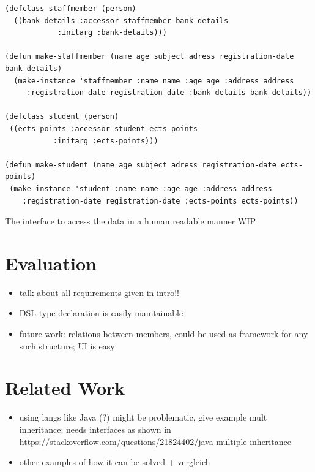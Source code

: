 \documentclass[oribibl]{llncs}
\begin{document}
\begin{listing}[]%
\begin{verbatim}
(defclass staffmember (person)
  ((bank-details :accessor staffmember-bank-details
            :initarg :bank-details)))

(defun make-staffmember (name age subject adress registration-date bank-details)
  (make-instance 'staffmember :name name :age age :address address
     :registration-date registration-date :bank-details bank-details))

(defclass student (person)
 ((ects-points :accessor student-ects-points
           :initarg :ects-points)))

(defun make-student (name age subject adress registration-date ects-points)
 (make-instance 'student :name name :age age :address address
    :registration-date registration-date :ects-points ects-points))

\end{verbatim}
\caption{The interface to access the data in a human readable manner WIP}
\label{lst:clossyntax}
\end{listing}


\section{Evaluation}
\label{sec:evaluation}

\begin{itemize}
\item talk about all requirements given in intro!!
\item DSL type declaration is easily maintainable
\item future work: relations between members, could be used as framework for any such structure; UI is easy 
\end{itemize}

\section{Related Work}
\label{sec:related}

\begin{itemize}
\item using langs like Java (?) might be problematic, give example mult inheritance: needs interfaces as shown in https://stackoverflow.com/questions/21824402/java-multiple-inheritance
\item other examples of how it can be solved + vergleich
\end{itemize}
\end{document}

